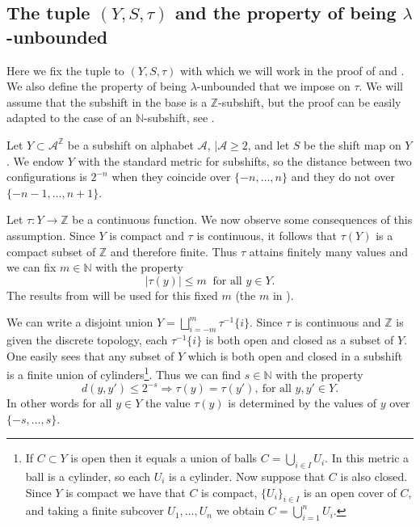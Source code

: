 \documentclass[a4paper,oneside]{amsart}
\renewcommand{\(}{\begin{dmath*}}
\renewcommand{\)}{\end{dmath*}}
\theoremstyle{definition}
\newcommand{\N}{\mathbb{N}}
\newcommand{\Z}{\mathbb{Z}}
\newcommand{\A}{\mathcal{A}}
\begin{document}
\subsection{The tuple $(Y,S,\tau)$ and the property of being $\lambda$-unbounded}\label{subsec:the-tuple-S}
Here we fix the tuple to   $(Y,S,\tau)$ with which we will work in the proof of  and . We also define the property of being $\lambda$-unbounded that we impose on $\tau$. We will assume that the subshift in the base is a $\Z$-subshift, but the proof can be easily adapted to the case of an $\N$-subshift, see .  
 
Let $Y\subset \A^\Z$ be a subshift on alphabet $\A$, $|\A
\geq 2$, and let $S$ be the shift map on $Y$. %
We endow $Y$ with the standard metric for subshifts, so the distance between two configurations is $2^{-n}$ when they coincide over $\{-n,\dots,n\}$ and they do not over $\{-n-1,\dots,n+1\}$. 


Let $\tau\colon Y \to \Z$ be a continuous function.  We now observe some consequences of this assumption. Since $Y$ is compact and $\tau$ is continuous, it follows that $\tau (Y)$ is a compact subset of $\Z$ and therefore finite. Thus $\tau$ attains finitely many values and we can  fix $m\in\N$ with the property 
\begin{equation}\label{constant-m}|\tau(y)|\leq m \ \text{ for all } y\in Y.\end{equation}
The results from  will be used for this  fixed $m$ (the $m$ in ). 

We can write a disjoint union  $Y=\bigsqcup _{i=-m}^{m}\tau^{-1}\{i\}$. Since $\tau$ is continuous and $\Z$ is given the discrete topology, each $\tau^{-1}\{i\}$ is both open and closed as a subset of $Y$. One easily sees that any subset of $Y$ which is both open and closed in a subshift is a finite union of cylinders\footnote{If  $C\subset Y$ is open then it equals a union of balls $C=\bigcup_{i\in I} U_i$. In this metric a ball is a cylinder, so each $U_i$ is a cylinder. Now suppose that $C$ is also closed. Since $Y$ is compact we have that $C$ is compact, $\{U_i\}_{i\in I}$ is an open cover of $C$, and taking a finite subcover $U_1,\dots, U_n$ we obtain $C=\bigcup _{i=1}^n U_i$.}. Thus we can find  $s\in\N$ with the property
\begin{equation}\label{constant-s}
    d(y,y')\leq 2^{-s}\Rightarrow \tau(y)=\tau(y'), \ \text{for all }y,y'\in Y.
\end{equation}
In other words for all $y\in Y$ the value  $\tau(y)$ is determined by the values of $y$ over $\{-s,\dots,s\}$. 
\end{document}
